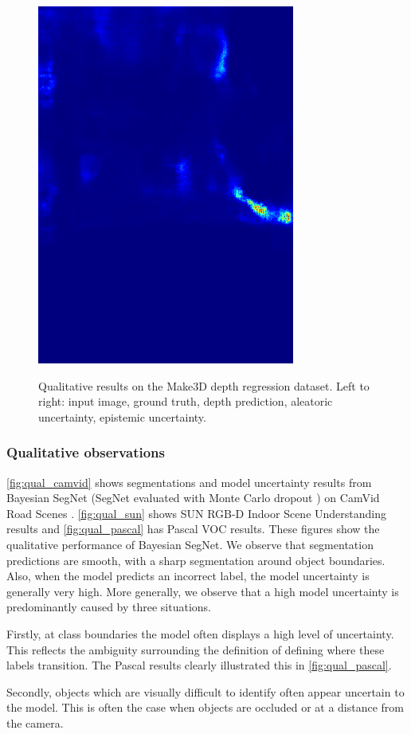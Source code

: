 \begin{figure}[p]
{\includegraphics[width=0.3\linewidth]{segnet_11_output_4.png}}
\caption[Qualitative results on the Make3D depth regression dataset.]{Qualitative results on the Make3D depth regression dataset. Left to right: input image, ground truth, depth prediction, aleatoric uncertainty, epistemic uncertainty. 
}
\label{fig:make3d_qual}
\end{figure}


\subsubsection{Qualitative observations}
\cref{fig:qual_camvid} shows segmentations and model uncertainty results from Bayesian SegNet (SegNet evaluated with Monte Carlo dropout \citep{kendall2015bayesian}) on CamVid Road Scenes \citep{brostow2009semantic}. \cref{fig:qual_sun} shows SUN RGB-D Indoor Scene Understanding \citep{song2015sun} results and \cref{fig:qual_pascal} has Pascal VOC \citep{pascal} results. These figures show the qualitative performance of Bayesian SegNet. We observe that segmentation predictions are smooth, with a sharp segmentation around object boundaries. Also, when the model predicts an incorrect label, the model uncertainty is generally very high. More generally, we observe that a high model uncertainty is predominantly caused by three situations.

Firstly, at class boundaries the model often displays a high level of uncertainty. This reflects the ambiguity surrounding the definition of defining where these labels transition. The Pascal results clearly illustrated this in \cref{fig:qual_pascal}.

Secondly, objects which are visually difficult to identify often appear uncertain to the model. This is often the case when objects are occluded or at a distance from the camera.

